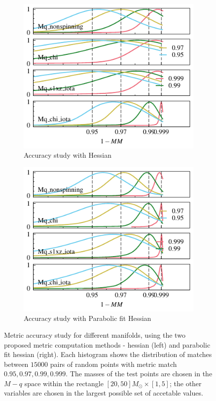 \documentclass[twocolumn,showpacs,preprintnumbers,nofootinbib,prd,
superscriptaddress,10pt]{revtex4-2}
\begin{document}
\begin{figure}[t]
	\centering
	\begin{subfigure}{0.4\textwidth}
		\includegraphics{metric_accuracy_hessian}
		\caption{Accuracy study with Hessian}
		\label{fig:metric_accuracy_hessian}
	\end{subfigure}\hfill
	\begin{subfigure}{0.4\textwidth}
		\includegraphics{metric_accuracy_parabolic}
		\caption{Accuracy study with Parabolic fit Hessian}
		\label{fig:metric_accuracy_parabolic}
	\end{subfigure}
	\caption{Metric accuracy study for different manifolds, using the two proposed metric computation methods - hessian (left) and parabolic fit hessian (right).
	Each histogram shows the distribution of matches between $15000$ pairs of random points with metric match $0.95, 0.97, 0.99, 0.999$. The masses of the test points are chosen in the $M-q$ space within the rectangle ${[20, 50] M_\odot \times [1,5]}$; the other variables are chosen in the largest possible set of accetable values.}
	\label{fig:metric_accuracy}
\end{figure}
\end{document}
